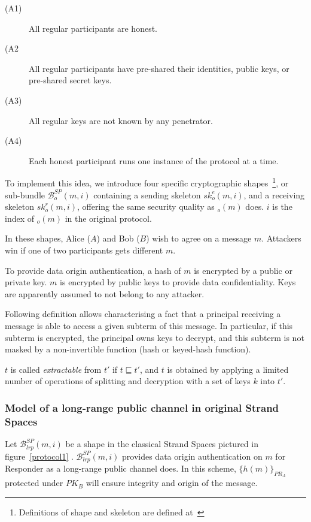\begin{description}
\item [(A1)] All regular participants are honest. 
\item [(A2] All regular participants have pre-shared their identities, public keys, or pre-shared secret keys. 
\item [(A3)] All regular keys are not known by any penetrator. 
\item [(A4)] Each honest participant runs one instance of the protocol at a time. 
\end{description}

To implement this idea, we introduce four specific cryptographic shapes~\footnote{Definitions of shape and skeleton are defined at~\cite{Doghmi:2007:SHS:1230146.1230260}}, or sub-bundle $\mathcal{B}^{SP}_{o}(m,i)$ containing a sending skeleton $sk^e_o(m,i)$, and a receiving skeleton $sk^r_o(m,i)$, offering the same security quality as $_o(m)$ does. $i$ is the index of $_o(m)$ in the original protocol.

In these shapes, Alice ($A$) and Bob ($B$) wish to agree on a message $m$. Attackers win if one of two participants gets different $m$. 

To provide data origin authentication, a hash of $m$ is encrypted by a public or private key. $m$ is encrypted by public keys to provide data confidentiality. Keys are apparently assumed to not belong to any attacker. 

Following definition allows characterising a fact that a principal receiving a message is able to access a given subterm of this message. In particular, if this subterm is encrypted, the principal owns keys to decrypt, and this subterm is not masked by a non-invertible function (hash or keyed-hash function). 

\begin{Definition}[Extractable]
$t$ is called \emph{extractable} from $t'$ if $t \sqsubseteq t'$, and $t$ is obtained by applying a limited number of operations of splitting and decryption with a set of keys $k$ into $t'$.
\end{Definition}

\subsubsection*{Model of a long-range public channel in original Strand Spaces}\label{longrange}

Let $\mathcal{B}^{SP}_{lrp}(m,i)$ be a shape in the classical Strand Spaces pictured in figure~\ref{protocol1} . $\mathcal{B}^{SP}_{lrp}(m,i)$ provides data origin authentication on $m$ for Responder as a long-range public channel does. In this scheme, $\{h(m)\}_{PR_A}$ protected under $PK_B$ will ensure integrity and origin of the message. 

